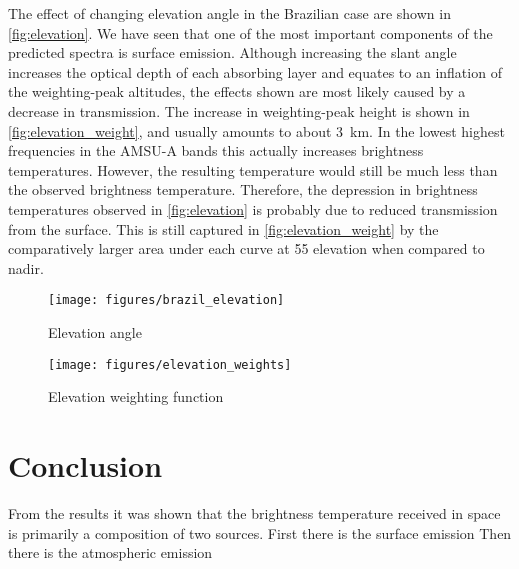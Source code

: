\documentclass[twocol]{ametsoc}
\begin{document}
The effect of changing elevation angle in the Brazilian case are shown in \autoref{fig:elevation}.
We have seen that one of the most important components of the predicted spectra is surface emission.
Although increasing the slant angle increases the optical depth of each absorbing layer and equates to an inflation of the weighting-peak altitudes, the effects shown are most likely caused by a decrease in transmission.
The increase in weighting-peak height is shown in \autoref{fig:elevation_weight}, and usually amounts to about 3~km.
In the lowest highest frequencies in the AMSU-A bands this actually increases brightness temperatures.
However, the resulting temperature would still be much less than the observed brightness temperature.
Therefore, the depression in brightness temperatures observed in \autoref{fig:elevation} is probably due to reduced transmission from the surface.
This is still captured in \autoref{fig:elevation_weight} by the comparatively larger area under each curve at 55\degree{} elevation when compared to nadir.

\begin{figure}
	\centering
	\texttt{[image: figures/brazil\_elevation]}
	\caption{Elevation angle}
	\label{fig:elevation}
\end{figure}

\begin{figure}
	\centering
	\texttt{[image: figures/elevation\_weights]}
	\caption{Elevation weighting function}
	\label{fig:elevation_weight}
\end{figure}

\section{Conclusion}

From the results it was shown that the brightness temperature received in space is primarily a composition of two sources.
First there is the surface emission
Then there is the atmospheric emission


 
 
\end{document}
